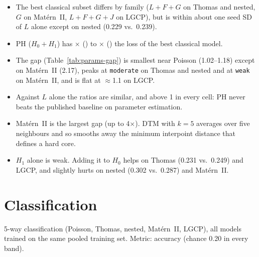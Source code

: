 \documentclass[10pt,a4paper]{article}
\begin{document}
\begin{itemize}
  \item The best classical subset differs by family ($L{+}F{+}G$ on Thomas and nested, $G$ on Mat\'ern~II, $L{+}F{+}G{+}J$ on LGCP), but is within about one seed SD of $L$ alone except on nested (0.229 vs.\ 0.239).
  \item PH ($H_0{+}H_1$) has \pRatioLo$\times$ (\pRatioLoFam) to \pRatioHi$\times$ (\pRatioHiFam) the loss of the best classical model.
  \item The gap (Table~\ref{tab:params-gap}) is smallest near Poisson (1.02--1.18) except on Mat\'ern~II (2.17), peaks at \texttt{moderate} on Thomas and nested and at \texttt{weak} on Mat\'ern~II, and is flat at $\approx$1.1 on LGCP.
  \item Against $L$ alone the ratios are similar, and above 1 in every cell: PH never beats the published baseline on parameter estimation.
  \item Mat\'ern~II is the largest gap (up to 4$\times$). DTM with $k=5$ averages over five neighbours and so smooths away the minimum interpoint distance that defines a hard core.
  \item $H_1$ alone is weak. Adding it to $H_0$ helps on Thomas (0.231 vs.\ 0.249) and LGCP, and slightly hurts on nested (0.302 vs.\ 0.287) and Mat\'ern~II.
\end{itemize}

\section{Classification}

5-way classification (Poisson, Thomas, nested, Mat\'ern~II, LGCP), all models trained on the same pooled training set. Metric: accuracy (chance 0.20 in every band).




\end{document}
